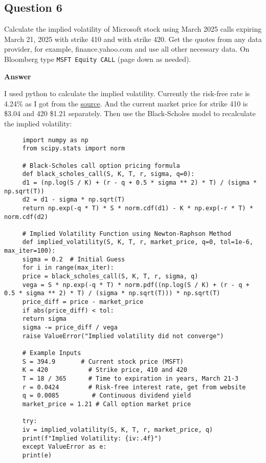 \documentclass[letterpaper]{article}
\begin{document}
	 \subsection*{Question 6}
	 Calculate the implied volatility of Microsoft stock using March 2025 calls expiring March 21, 2025 with strike 410 and with strike 420. Get the quotes from any data provider, for example, finance.yahoo.com and use all other necessary data. On Bloomberg type \texttt{MSFT Equity CALL} (page down as needed).
	 
	 \textbf{Answer}
	 
	 I used python to calculate the implied volatility. Currently the risk-free rate is 4.24\% as I got from the  \href{https://ycharts.com/indicators/10_year_treasury_rate}{source}. And the current market price for strike 410 is \$3.04 and 420 \$1.21 separately. Then use the Black-Scholes model to recalculate the implied volatility:
	 
	 \begin{lstlisting}
     import numpy as np
     from scipy.stats import norm
     
     # Black-Scholes call option pricing formula
     def black_scholes_call(S, K, T, r, sigma, q=0):
     d1 = (np.log(S / K) + (r - q + 0.5 * sigma ** 2) * T) / (sigma * np.sqrt(T))
     d2 = d1 - sigma * np.sqrt(T)
     return np.exp(-q * T) * S * norm.cdf(d1) - K * np.exp(-r * T) * norm.cdf(d2)
     
     # Implied Volatility Function using Newton-Raphson Method
     def implied_volatility(S, K, T, r, market_price, q=0, tol=1e-6, max_iter=100):
     sigma = 0.2  # Initial Guess
     for i in range(max_iter):
     price = black_scholes_call(S, K, T, r, sigma, q)
     vega = S * np.exp(-q * T) * norm.pdf((np.log(S / K) + (r - q + 0.5 * sigma ** 2) * T) / (sigma * np.sqrt(T))) * np.sqrt(T)
     price_diff = price - market_price
     if abs(price_diff) < tol:
     return sigma
     sigma -= price_diff / vega
     raise ValueError("Implied volatility did not converge")
     
     # Example Inputs
     S = 394.9       # Current stock price (MSFT)
     K = 420           # Strike price, 410 and 420
     T = 18 / 365      # Time to expiration in years, March 21-3
     r = 0.0424        # Risk-free interest rate, get from website
     q = 0.0085         # Continuous dividend yield
     market_price = 1.21 # Call option market price
     
     try:
     iv = implied_volatility(S, K, T, r, market_price, q)
     print(f"Implied Volatility: {iv:.4f}")
     except ValueError as e:
     print(e)
     
	 \end{lstlisting}
 
\end{document}
